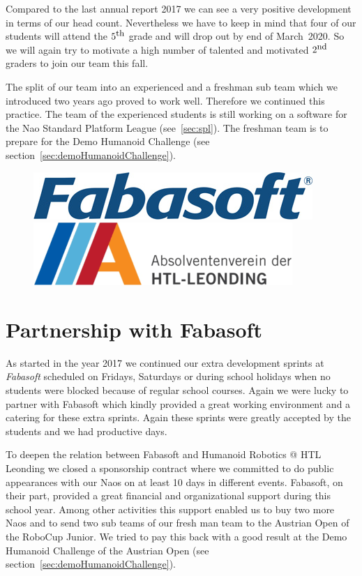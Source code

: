 \documentclass[11pt]{article}
\begin{document}
Compared to the last annual report 2017 we can see a very positive development in terms of our head count. Nevertheless we have to keep in mind that four of our students will attend the $5^{\textrm{\small th}}$ grade and will drop out by end of March~2020. So we will again try to motivate a high number of talented and motivated $2^{\textrm{\small nd}}$ graders to join our team this fall.

The split of our team into an experienced and a freshman sub team which we introduced two years ago proved to work well. Therefore we continued this practice. The team of the experienced students is still  working on a software for the Nao Standard Platform League (see~\ref{sec:spl}). The freshman team is to prepare for the Demo Humanoid Challenge (see section~\ref{sec:demoHumanoidChallenge}).

\begin{figure}[b]
\begin{center}
\includegraphics[scale=0.38]{img/fabasoft.png}
\hfill
\includegraphics[scale=0.38]{img/absleoLogo.png}
\end{center}
\end{figure}

\section{Partnership with Fabasoft}
As started in the year 2017 we continued our extra development sprints at {\em Fabasoft} scheduled on Fridays, Saturdays or during school holidays when no students were blocked because of regular school courses. Again we were lucky to partner with Fabasoft which kindly provided a great working environment and a catering for these extra sprints. Again these sprints were greatly accepted by the students and we had productive days.

To deepen the relation between Fabasoft and Humanoid Robotics @ HTL Leonding we closed a sponsorship contract where we committed to do public appearances with our Naos on at least 10 days in different events. Fabasoft, on their part, provided a great financial and organizational support during this school year. Among other activities this support enabled us to buy two more Naos and to send two sub teams of our fresh man team to the Austrian Open of the RoboCup Junior. We tried to pay this back with a good result at the Demo Humanoid Challenge of the Austrian Open (see section~\ref{sec:demoHumanoidChallenge}).
\end{document}
